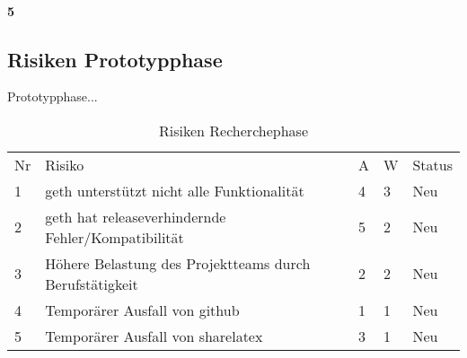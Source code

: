 \paragraph{5}


\subsection{Risiken Prototypphase}
Prototypphase...

\begin{table}[]
\centering
\caption{Risiken Recherchephase}
\label{}
\begin{tabular}{lllll}
Nr & Risiko                                                  & A & W & Status \\
1  & geth unterstützt nicht alle Funktionalität              & 4          & 3                  & Neu    \\
2  & geth hat releaseverhindernde Fehler/Kompatibilität      & 5          & 2                  & Neu    \\
3  & Höhere Belastung des Projektteams durch Berufstätigkeit & 2          & 2                  & Neu    \\
4  & Temporärer Ausfall von github                           & 1          & 1                  & Neu    \\
5  & Temporärer Ausfall von sharelatex                       & 3          & 1                  & Neu   
\end{tabular}
\end{table}

